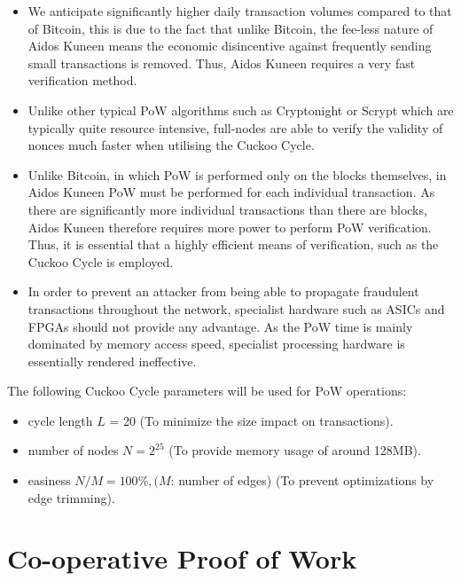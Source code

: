 \documentclass[a4paper,10pt,twocolumn]{article}
\begin{document}
	\begin{itemize}
	\item We anticipate significantly higher daily transaction volumes compared to that of Bitcoin, this is due to the fact that unlike Bitcoin, the fee-less nature of Aidos Kuneen means the economic disincentive against frequently sending small transactions is removed. Thus, Aidos Kuneen requires a very fast verification method.
	
	
	\item Unlike other typical PoW algorithms such as Cryptonight or Scrypt which are typically quite resource intensive, full-nodes are able to verify the validity of nonces much faster when utilising the Cuckoo Cycle. 
	
	\item Unlike Bitcoin, in which PoW is performed only on the blocks themselves, in Aidos Kuneen PoW must be performed for each individual transaction. As there are significantly more individual transactions than there are blocks, Aidos Kuneen therefore requires more power to perform PoW verification. Thus, it is essential that a highly efficient means of verification, such as the Cuckoo Cycle is employed.
	
	\item In order to prevent an attacker from being able to propagate fraudulent transactions throughout the network, specialist hardware such as ASICs and FPGAs should not provide any advantage. As the PoW time is mainly dominated by memory access speed, specialist processing hardware is essentially rendered ineffective.
	\end{itemize}
	
	The following Cuckoo Cycle parameters will be used for PoW operations:
	
	\begin{itemize}
		\item cycle length \( L\) = 20 (To minimize the size impact on transactions).
		\item number of nodes \( N = 2^{25} \) (To provide memory usage of around 128MB\@).
		\item easiness \(N/M = 100\% , (M\): number of edges) (To prevent optimizations by edge trimming).
	\end{itemize}
	
	\section{Co-operative Proof of Work}
	\label{sec:coPoW}
	
\end{document}
